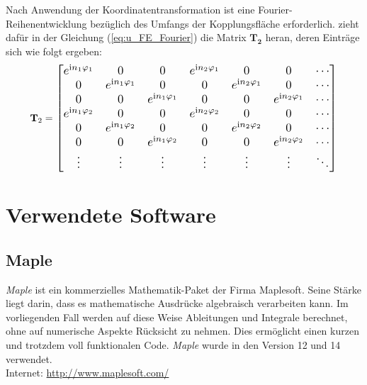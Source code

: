 Nach Anwendung der Koordinatentransformation ist eine Fourier-Reihenentwicklung bezüglich des Umfangs der Kopplungsfläche erforderlich.
\cite{Hackenberg2016} zieht dafür in der Gleichung (\ref{eq:u_FE_Fourier}) die Matrix $\mathbf{T_2}$ heran, deren Einträge sich wie folgt ergeben:
\begin{equation}\label{eq:T2_matrix}
	\mathbf T_{2} =
	\scalebox{1.20}{$
	\begin{bmatrix}
		e^{\mathrm{i}n_{1}\varphi_{1}} & 0 & 0 & e^{\mathrm{i}n_{2}\varphi_{1}} & 0 & 0 & \cdots \\
		0 & e^{\mathrm{i}n_{1}\varphi_{1}} & 0 & 0 & e^{\mathrm{i}n_{2}\varphi_{1}} & 0 & \cdots \\
		0 & 0 & e^{\mathrm{i}n_{1}\varphi_{1}} & 0 & 0 & e^{\mathrm{i}n_{2}\varphi_{1}} & \cdots \\
		e^{\mathrm{i}n_{1}\varphi_{2}} & 0 & 0 & e^{\mathrm{i}n_{2}\varphi_{2}} & 0 & 0 & \cdots \\
		0 & e^{\mathrm{i}n_{1}\varphi_{2}} & 0 & 0 & e^{\mathrm{i}n_{2}\varphi_{2}} & 0 & \cdots \\
		0 & 0 & e^{\mathrm{i}n_{1}\varphi_{2}} & 0 & 0 & e^{\mathrm{i}n_{2}\varphi_{2}} & \cdots \\
		\vdots & \vdots & \vdots & \vdots & \vdots & \vdots & \ddots
	\end{bmatrix}
	$}
\end{equation}



\section{Verwendete Software}
\label{cha:software}

\subsection{Maple\texttrademark}
\label{app:maple}
\emph{Maple\texttrademark} ist ein kommerzielles Mathematik-Paket der Firma Maplesoft. Seine Stärke liegt darin, dass es mathematische Ausdrücke algebraisch verarbeiten kann. Im vorliegenden Fall werden auf diese Weise Ableitungen und Integrale berechnet, ohne auf numerische Aspekte Rücksicht zu nehmen. Dies ermöglicht einen kurzen und trotzdem voll funktionalen Code. \emph{Maple\texttrademark} wurde in den Version 12 und 14 verwendet.\\
Internet: \url{http://www.maplesoft.com/}

